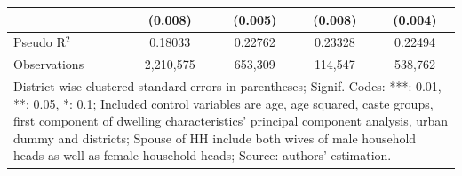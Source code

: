 \begin{table}[htb]
{\begin{tabular}{lcccc}
   						 & (0.008)                 & (0.005)                 & (0.008)				   & (0.004) \\ 
     \midrule
   Pseudo R$^2$          & 0.18033                 & 0.22762                 & 0.23328				   & 0.22494 \\ 
   Observations          & 2,210,575               & 653,309                 & 114,547				   & 538,762 \\  
   \midrule
   \midrule
   \multicolumn{5}{p{14.6cm}}{\footnotesize{ District-wise clustered standard-errors in parentheses; Signif. Codes: ***: 0.01, **: 0.05, *: 0.1; Included control variables are age, age squared, caste groups, first component of dwelling characteristics' principal component analysis, urban dummy and districts; Spouse of HH include both wives of male household heads as well as female household heads; Source: authors' estimation.}}\\
\end{tabular}}
\label{tab:logitGenderedEngagementsInJobs}
\end{table}


